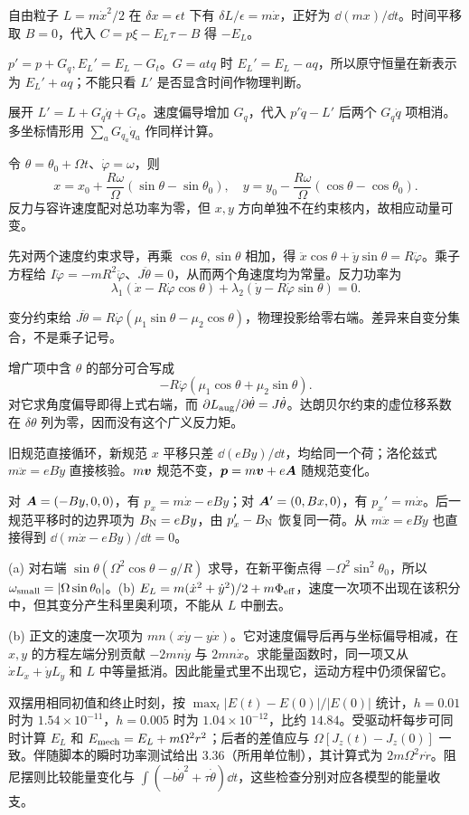 \begin{bookexercises}
自由粒子 $L=m\dot x^2/2$ 在 $\delta x=\epsilon t$ 下有 $\delta L/\epsilon=m\dot x$，正好为 $\dd(mx)/\dd t$。时间平移取 $B=0$，代入 $C=p\xi-E_L\tau-B$ 得 $-E_L$。
\item $p'=p+G_q,E_L'=E_L-G_t$。$G=atq$ 时 $E_L'=E_L-aq$，所以原守恒量在新表示为 $E_L'+aq$；不能只看 $L'$ 是否显含时间作物理判断。

展开 $L'=L+G_q\dot q+G_t$。速度偏导增加 $G_q$，代入 $p'\dot q-L'$ 后两个 $G_q\dot q$ 项相消。多坐标情形用 $\sum_a G_{q_a}\dot q_a$ 作同样计算。
\item 令 $\theta=\theta_0+\Omega t$、$\dot\varphi=\omega$，则
\[
x=x_0+\frac{R\omega}{\Omega}(\sin\theta-\sin\theta_0),\quad
y=y_0-\frac{R\omega}{\Omega}(\cos\theta-\cos\theta_0).
\]
反力与容许速度配对总功率为零，但 $x,y$ 方向单独不在约束核内，故相应动量可变。

先对两个速度约束求导，再乘 $\cos\theta,\sin\theta$ 相加，得 $\ddot x\cos\theta+\ddot y\sin\theta=R\ddot\varphi$。乘子方程给 $I\ddot\varphi=-mR^2\ddot\varphi$、$J\ddot\theta=0$，从而两个角速度均为常量。反力功率为
\[
\lambda_1(\dot x-R\dot\varphi\cos\theta)
+\lambda_2(\dot y-R\dot\varphi\sin\theta)=0.
\]
\item 变分约束给 $J\ddot\theta=R\dot\varphi(\mu_1\sin\theta-\mu_2\cos\theta)$，物理投影给零右端。差异来自变分集合，不是乘子记号。

增广项中含 $\theta$ 的部分可合写成
\[
-R\dot\varphi(\mu_1\cos\theta+\mu_2\sin\theta).
\]
对它求角度偏导即得上式右端，而 $\partial L_{\rm aug}/\partial\dot\theta=J\dot\theta$。达朗贝尔约束的虚位移系数在 $\delta\theta$ 列为零，因而没有这个广义反力矩。
\item 旧规范直接循环，新规范 $x$ 平移只差 $\dd(eBy)/\dd t$，均给同一个荷；洛伦兹式 $m\ddot x=eB\dot y$ 直接核验。$m\boldsymbol{v}$ 规范不变，$\boldsymbol{p}=m\boldsymbol{v}+e\boldsymbol{A}$ 随规范变化。

对 $\boldsymbol{A}=(-By,0,0)$，有 $p_x=m\dot x-eBy$；对 $\boldsymbol{A}'=(0,Bx,0)$，有 $p_x'=m\dot x$。后一规范平移时的边界项为 $B_{\rm N}=eBy$，由 $p_x'-B_{\rm N}$ 恢复同一荷。从 $m\ddot x=eB\dot y$ 也直接得到 $\dd(m\dot x-eBy)/\dd t=0$。
\item (a) 对右端 $\sin\theta(\Omega^2\cos\theta-g/R)$ 求导，在新平衡点得 $-\Omega^2\sin^2\theta_0$，所以 $\omega_{\rm small}=|\Omega\sin\theta_0|$。(b) $E_L=m(\dot x^2+\dot y^2)/2+m\Phi_{\rm eff}$，速度一次项不出现在该积分中，但其变分产生科里奥利项，不能从 $L$ 中删去。

(b) 正文的速度一次项为 $mn(x\dot y-y\dot x)$。它对速度偏导后再与坐标偏导相减，在 $x,y$ 的方程左端分别贡献 $-2mn\dot y$ 与 $2mn\dot x$。求能量函数时，同一项又从 $\dot xL_{\dot x}+\dot yL_{\dot y}$ 和 $L$ 中等量抵消。因此能量式里不出现它，运动方程中仍须保留它。
\item 双摆用相同初值和终止时刻，按 $\max_t|E(t)-E(0)|/|E(0)|$ 统计，$h=0.01$ 时为 $1.54\times10^{-11}$，$h=0.005$ 时为 $1.04\times10^{-12}$，比约 $14.84$。受驱动杆每步可同时计算 $E_L$ 和 $E_{\rm mech}=E_L+m\Omega^2r^2$；后者的差值应与 $\Omega[J_z(t)-J_z(0)]$ 一致。伴随脚本的瞬时功率测试给出 $3.36$（所用单位制），其计算式为 $2m\Omega^2r\dot r$。阻尼摆则比较能量变化与 $\int(-b\dot\theta^2+\tau\dot\theta)\dd t$，这些检查分别对应各模型的能量收支。
\end{bookexercises}

